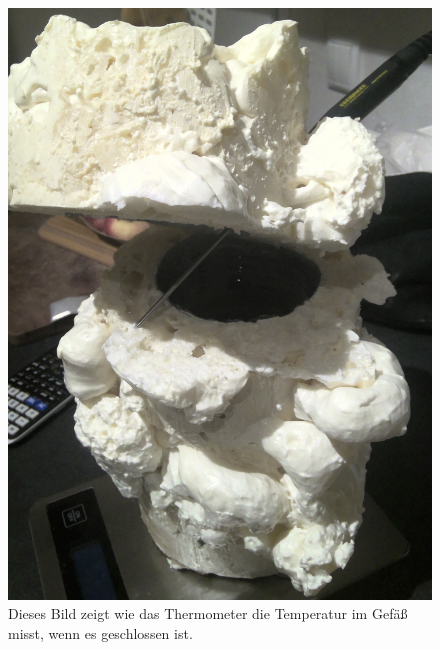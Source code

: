\documentclass[11pt, ngerman]{scrartcl}
\begin{document}
\begin{figure}[H]
\begin{minipage}[t]{.30\linewidth}
		\includegraphics[width=\linewidth]{pics/Aufbau (3).jpg}
		\caption{Dieses Bild zeigt wie das Thermometer die Temperatur im Gefäß misst,
			wenn es geschlossen ist.}
		\label{fig:aufbauthermo}
	\end{minipage}
\end{figure}
\end{document}
